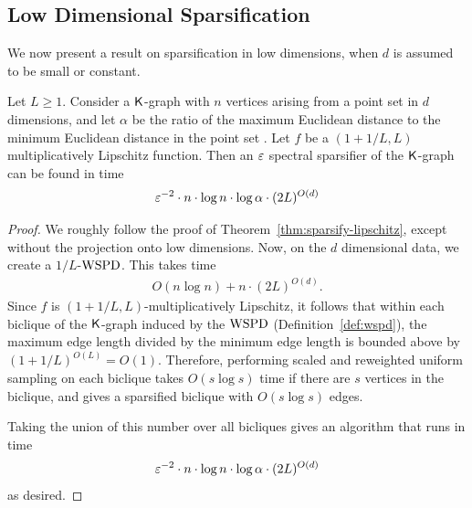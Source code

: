\subsection{Low Dimensional Sparsification}

We now present a result on sparsification in low dimensions, when $d$ is assumed to be small or constant. 

\begin{theorem}\label{thm:low-sparsify-lipschitz}
Let $L \geq 1$. Consider a $\mathsf{K}$-graph with $n$ vertices arising from a point set in $d$ dimensions, and let $\alpha$ be the ratio of the maximum Euclidean distance to the minimum Euclidean distance in the point set . Let $f$ be a $(1+1/L, L)$ multiplicatively Lipschitz function. Then an $\varepsilon$ spectral sparsifier of the $\mathsf{K}$-graph can be found in time
\begin{align*}
    \varepsilon^{-2} \cdot n  \cdot \log n \cdot \log \alpha   \cdot (2L)^{O(d)} 
\end{align*}
\end{theorem}
\begin{proof} We roughly follow the proof of Theorem~\ref{thm:sparsify-lipschitz}, except without the projection onto low dimensions. Now, on the $d$ dimensional data, we create a $1/L$-$\mathrm{WSPD}$. This takes time 
\begin{align*}
O( n \log n ) + n \cdot (2L)^{O(d)}.
\end{align*}
Since $f$ is $(1+1/L,L)$-multiplicatively Lipschitz, it follows that within each biclique of the $\mathsf{K}$-graph induced by the $\mathrm{WSPD}$ (Definition~\ref{def:wspd}), the maximum edge length divided by the minimum edge length is bounded above by $(1+1/L)^{O(L)} = O(1)$. Therefore, performing scaled and reweighted uniform sampling on each biclique takes $O(s \log s)$ time if there are $s$ vertices in the biclique, and gives a sparsified biclique with $O(s \log s)$ edges. 

Taking the union of this number over all bicliques gives an algorithm that runs in time
\begin{align*}
 \varepsilon^{-2} \cdot n \cdot \log n \cdot \log \alpha \cdot (2L)^{O(d)} 
\end{align*}
as desired.
\end{proof}
